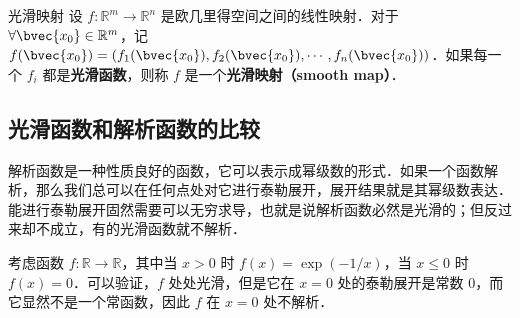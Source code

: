 \begin{definition}{光滑映射}
设 $f:\mathbb{R}^m\rightarrow \mathbb{R}^n$ 是欧几里得空间之间的线性映射．对于 $\forall \bvec{x_0} \in \mathbb{R}^m$，记 $f(\bvec{x_0})=(f_1(\bvec{x_0}), f_2(\bvec{x_0}),\cdots, f_n(\bvec{x_0}))$．如果每一个 $f_i$ 都是\textbf{光滑函数}，则称 $f$ 是一个\textbf{光滑映射（smooth map）}．
\end{definition}

\subsection{光滑函数和解析函数的比较}

解析函数是一种性质良好的函数，它可以表示成幂级数的形式．如果一个函数解析，那么我们总可以在任何点处对它进行泰勒展开，展开结果就是其幂级数表达．能进行泰勒展开固然需要可以无穷求导，也就是说解析函数必然是光滑的；但反过来却不成立，有的光滑函数就不解析．

\begin{example}{}\label{SmthM_ex1}
考虑函数 $f:\mathbb{R}\rightarrow\mathbb{R}$，其中当 $x>0$ 时 $f(x)=\exp{(-1/x)}$，当 $x\leq 0$ 时 $f(x)=0$．可以验证，$f$ 处处光滑，但是它在 $x=0$ 处的泰勒展开是常数 $0$，而它显然不是一个常函数，因此 $f$ 在 $x=0$ 处不解析．
\end{example}



